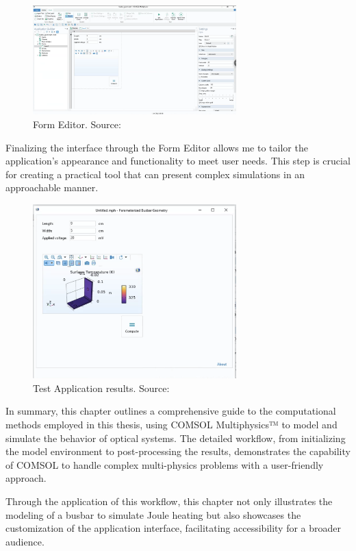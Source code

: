 \begin{figure}[H]
    \centering
    \includegraphics[width=0.7\textwidth]{Chapters/Figures/Chapter 3 Figures/Form Editor Desktop.png}
    \caption{Form Editor. Source: \cite{multiphysics__modeling_nodate}}
    \label{fig:Form Editor}
\end{figure}

Finalizing the interface through the Form Editor allows me to tailor the application's appearance and functionality to meet user needs. This step is crucial for creating a practical tool that can present complex simulations in an approachable manner.

\begin{figure}[H]
    \centering
    \includegraphics[width=0.7\textwidth]{Chapters/Figures/Chapter 3 Figures/Test Application Results.png}
    \caption{Test Application results. Source: \cite{multiphysics__modeling_nodate}}
    \label{fig:Test Application results}
\end{figure}

In summary, this chapter outlines a comprehensive guide to the computational methods employed in this thesis, using COMSOL Multiphysics™ to model and simulate the behavior of optical systems. The detailed workflow, from initializing the model environment to post-processing the results, demonstrates the capability of COMSOL to handle complex multi-physics problems with a user-friendly approach.

Through the application of this workflow, this chapter not only illustrates the modeling of a busbar to simulate Joule heating but also showcases the customization of the application interface, facilitating accessibility for a broader audience.
